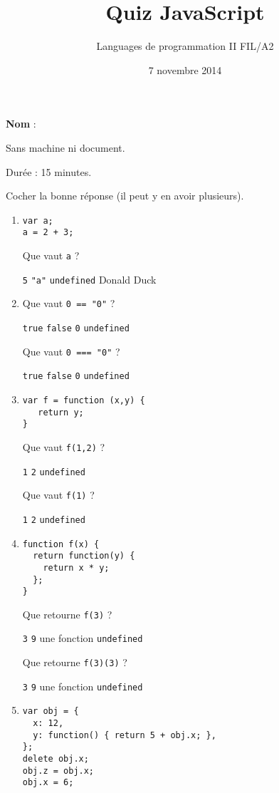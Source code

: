 \documentclass[a4paper, 12pt]{article}
\title{Quiz JavaScript}
\author{Languages de programmation II FIL/A2}
\date{7 novembre 2014}
\newcommand{\choice}[1]{\Square\hspace{2pt} #1\hspace{5pt}}
\newcommand{\choicec}[1]{\Square\hspace{2pt} \lstinline{#1}\hspace{5pt}}
\begin{document}
\maketitle

\textbf{Nom} :

Sans machine ni document.

Durée : 15 minutes.

Cocher la bonne réponse (il peut y en avoir plusieurs).

\begin{enumerate}
\item \lstset{language=javascript}
\begin{lstlisting}
var a;
a = 2 + 3;
\end{lstlisting}

  Que vaut \lstinline{a} ?

  \choicec{5} \choicec{"a"} \choicec{undefined} \choice{Donald Duck}
\item \lstset{language=javascript}
  Que vaut \lstinline{0 == "0"} ?

  \choicec{true} \choicec{false} \choicec{0} \choicec{undefined}

  Que vaut \lstinline{0 === "0"} ?

  \choicec{true} \choicec{false} \choicec{0} \choicec{undefined}
\item \lstset{language=javascript}
\begin{lstlisting}
var f = function (x,y) {
   return y;
}
\end{lstlisting}

   Que vaut \lstinline{f(1,2)} ?

   \choicec{1} \choicec{2} \choicec{undefined}

   Que vaut \lstinline{f(1)} ?

   \choicec{1} \choicec{2} \choicec{undefined}
\item \lstset{language=javascript}
\begin{lstlisting}
function f(x) {
  return function(y) {
    return x * y;
  };
}
\end{lstlisting}

  Que retourne \lstinline{f(3)} ?

  \choicec{3} \choicec{9} \choice{une fonction} \choicec{undefined}

  Que retourne \lstinline{f(3)(3)} ?

  \choicec{3} \choicec{9} \choice{une fonction} \choicec{undefined}
\item \lstset{language=javascript}
\begin{lstlisting}
var obj = {
  x: 12,
  y: function() { return 5 + obj.x; },
};
delete obj.x;
obj.z = obj.x;
obj.x = 6;
\end{lstlisting}


\end{enumerate}
\end{document}
